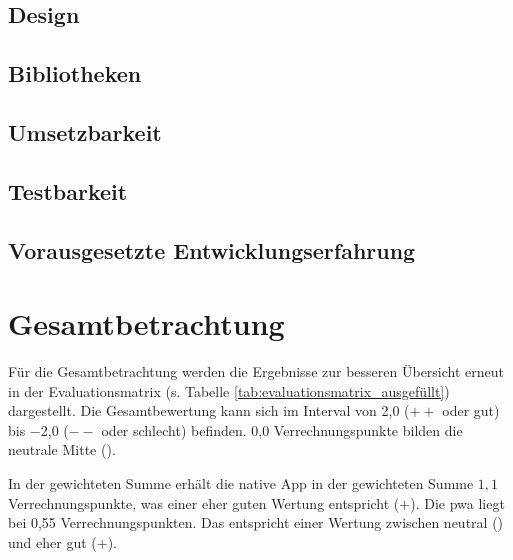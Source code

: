 \subsection{Design} \label{sec:6-konsistenz-des-designs}


\subsection{Bibliotheken} \label{sec:6-bibliotheken}


\subsection{Umsetzbarkeit} \label{sec:6-umsetzung}


\subsection{Testbarkeit} \label{sec:6-testbarkeit}


\subsection{Vorausgesetzte Entwicklungserfahrung} \label{sec:6-vorausgesetzte-entwicklungserfahrung}


%

\section{Gesamtbetrachtung}
Für die Gesamtbetrachtung werden die Ergebnisse zur besseren Übersicht erneut in der Evaluationsmatrix (s. Tabelle \ref{tab:evaluationsmatrix_ausgefüllt}) dargestellt. Die Gesamtbewertung kann sich im Interval von 2,0 ($++$ oder gut) bis $-$2,0 ($--$ oder schlecht) befinden. 0,0 Verrechnungspunkte bilden die neutrale Mitte (\Circle).

 In der gewichteten Summe erhält die native App in der gewichteten Summe $1,1$ Verrechnungspunkte, was einer eher guten Wertung entspricht ($+$). Die \ac{pwa} liegt bei 0,55 Verrechnungspunkten. Das entspricht einer Wertung zwischen neutral (\Circle) und eher gut ($+$).
 
